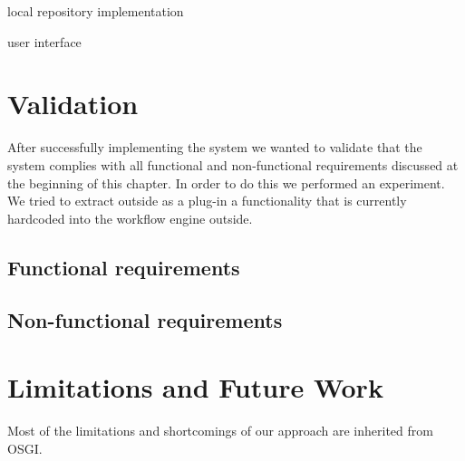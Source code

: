 local repository implementation

user interface

\section{Validation}

After successfully implementing the system we wanted to validate that the system complies with all functional and non-functional requirements discussed at the beginning of this chapter. In order to do this we performed an experiment. We tried to extract outside as a plug-in a functionality that is currently hardcoded into the workflow engine outside.

\subsection{Functional requirements}

\subsection{Non-functional requirements}



\section{Limitations and Future Work}

Most of the limitations and shortcomings of our approach are inherited from OSGI. 

